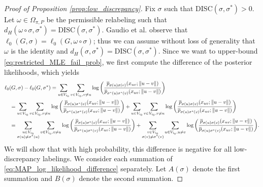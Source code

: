 \documentclass{article}
\newcommand{\1}{\mathbbm{1}}
\theoremstyle{definition}
\theoremstyle{plain}
\begin{document}
\begin{proof}[Proof of Proposition \ref{prop:low_discrepancy}]
    Fix $\sigma$ such that $\text{DISC}(\sigma, \sigma^*) > 0$. Let $\omega \in \Omega_{\pi, P}$ be the permissible relabeling such that $d_H(\omega \circ \sigma, \sigma^*) = \text{DISC}(\sigma, \sigma^*)$. Gaudio et al. \cite{Gaudio+2025} observe that $\ell_0(G, \sigma) = \ell_0(G, \omega \circ \sigma)$; thus we can assume without loss of generality that $\omega$ is the identity and $d_H(\sigma, \sigma^*) = \text{DISC}(\sigma, \sigma^*)$. Since we want to upper-bound \eqref{eq:restricted_MLE_fail_prob}, we first compute the difference of the posterior likelihoods, which yields
    \begin{align}
    \label{eq:MAP_log_likelihood_difference}
        &\ell_0(G, \sigma) - \ell_0(G, \sigma^*) = \sum_{u \in V_{i_0}} \sum_{v \in V_{i_0}, v \neq u} \log \bigg(\frac{\overline{p}_{\sigma(u)\sigma(v)}(x_{uv}; \|u - v\|)}{\overline{p}_{\sigma^*(u)\sigma^*(v)}(x_{uv}; \|u - v\|)} \bigg) \notag \\
        &\quad= \sum_{u \in V_{i_0}} \sum_{v \in V_{i_0}, v \neq u} \log \bigg(\frac{\overline{p}_{\sigma(u)\sigma^*(v)}(x_{uv}; \|u - v\|)}{\overline{p}_{\sigma^*(u)\sigma^*(v)}(x_{uv}; \|u - v\|)} \bigg) 
        + \sum_{u \in V_{i_0}} \sum_{v \in V_{i_0}, v \neq u} \log \bigg(\frac{\overline{p}_{\sigma(u)\sigma(v)}(x_{uv}; \|u - v\|)}{\overline{p}_{\sigma(u)\sigma^*(v)}(x_{uv}; \|u - v\|)} \bigg) \notag \\
        &\quad= \sum_{\substack{u \in V_{i_0} \\ \sigma(u) \neq \sigma^*(u)}} \sum_{v \in V_{i_0}, v \neq u} \log \bigg(\frac{\overline{p}_{\sigma(u)\sigma^*(v)}(x_{uv}; \|u - v\|)}{\overline{p}_{\sigma^*(u)\sigma^*(v)}(x_{uv}; \|u - v\|)} \bigg) 
        + \sum_{\substack{v \in V_{i_0} \\ \sigma(v) \neq \sigma^*(v)}} \sum_{u \in V_{i_0}, u \neq v} \log \bigg(\frac{\overline{p}_{\sigma(u)\sigma(v)}(x_{uv}; \|u - v\|)}{\overline{p}_{\sigma(u)\sigma^*(v)}(x_{uv}; \|u - v\|)} \bigg).
    \end{align}
    We will show that with high probability, this difference is negative for all low-discrepancy labelings. We consider each summation of \eqref{eq:MAP_log_likelihood_difference} separately. Let $A(\sigma)$ denote the first summation and $B(\sigma)$ denote the second summation.


\end{proof}
\end{document}
